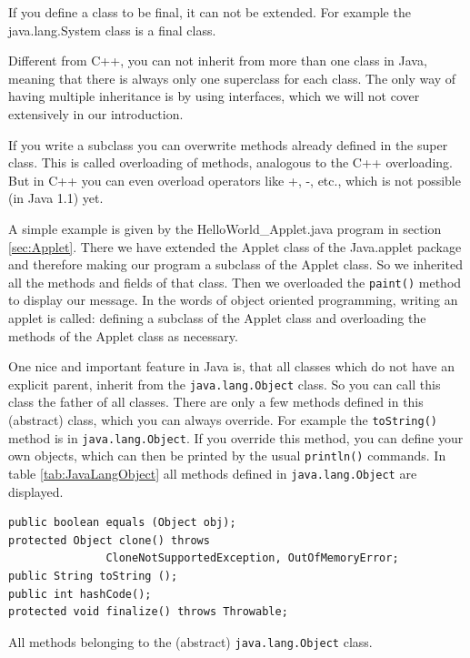 If you define a class to be final, it can not be extended.
For example the java.lang.System class is a final class.

Different from C++,  you can not inherit from more than one class
in Java, meaning that there is always only one superclass for each
class. 
The only way of having multiple inheritance is by using
interfaces, which we will not cover extensively in our introduction.

If you write a subclass you can overwrite methods already defined
in the super class. This is called overloading of methods,
analogous to the C++ overloading. But in C++ you can even
overload operators like +, -, etc., which is not possible (in Java 1.1) yet.

A simple example is given by the
HelloWorld\_Applet.java program in section \ref{sec:Applet}.
There we have extended the Applet class of the Java.applet package
and therefore making our program a subclass of the Applet class.
So we inherited all the methods and fields of that class. Then we
overloaded the \verb|paint()| method to display our message. 
In the words of object oriented programming, writing an applet is
called: defining a subclass of the Applet class and overloading
the methods of the Applet class as necessary.

One nice and important feature in Java is, that all classes which
do not have an explicit parent, inherit from the \verb|java.lang.Object| 
class. So you can call this class the father of all classes.
There are only a few methods defined in this (abstract) class,
which you can always override. For example the \verb|toString()| 
method is in \verb|java.lang.Object|. If you override this method,
you can define your own objects, which can then be printed by
the usual \verb|println()| commands. In table \ref{tab:JavaLangObject}
all methods defined in \verb|java.lang.Object| are displayed.
\begin{table}[htbp]
  \begin{center}
\begin{small}
\begin{verbatim}
public boolean equals (Object obj);
protected Object clone() throws 
               CloneNotSupportedException, OutOfMemoryError;
public String toString ();
public int hashCode(); 
protected void finalize() throws Throwable;
\end{verbatim}
\end{small}
    \caption{All methods belonging to the (abstract) 
               \texttt{java.lang.Object} class.}
    \label{tab:JavaLangObject}
  \end{center}
\end{table}

